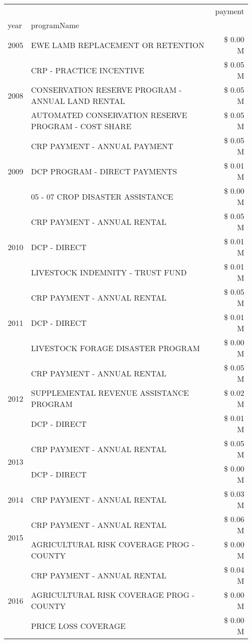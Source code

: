 \begin{tabular}{llr}
\toprule
 &  & payment \\
year & programName &  \\
\midrule
2005 & EWE LAMB REPLACEMENT OR RETENTION & \$ 0.00 M \\
\cline{1-3}
\multirow[t]{3}{*}{2008} & CRP - PRACTICE INCENTIVE & \$ 0.05 M \\
 & CONSERVATION RESERVE PROGRAM - ANNUAL LAND RENTAL & \$ 0.05 M \\
 & AUTOMATED CONSERVATION RESERVE PROGRAM - COST SHARE & \$ 0.05 M \\
\cline{1-3}
\multirow[t]{3}{*}{2009} & CRP PAYMENT - ANNUAL PAYMENT & \$ 0.05 M \\
 & DCP PROGRAM - DIRECT PAYMENTS & \$ 0.01 M \\
 & 05 - 07 CROP DISASTER ASSISTANCE & \$ 0.00 M \\
\cline{1-3}
\multirow[t]{3}{*}{2010} & CRP PAYMENT - ANNUAL RENTAL & \$ 0.05 M \\
 & DCP - DIRECT & \$ 0.01 M \\
 & LIVESTOCK INDEMNITY - TRUST FUND & \$ 0.01 M \\
\cline{1-3}
\multirow[t]{3}{*}{2011} & CRP PAYMENT - ANNUAL RENTAL & \$ 0.05 M \\
 & DCP - DIRECT & \$ 0.01 M \\
 & LIVESTOCK FORAGE DISASTER PROGRAM & \$ 0.00 M \\
\cline{1-3}
\multirow[t]{3}{*}{2012} & CRP PAYMENT - ANNUAL RENTAL & \$ 0.05 M \\
 & SUPPLEMENTAL REVENUE ASSISTANCE PROGRAM & \$ 0.02 M \\
 & DCP - DIRECT & \$ 0.01 M \\
\cline{1-3}
\multirow[t]{2}{*}{2013} & CRP PAYMENT - ANNUAL RENTAL & \$ 0.05 M \\
 & DCP - DIRECT & \$ 0.00 M \\
\cline{1-3}
2014 & CRP PAYMENT - ANNUAL RENTAL & \$ 0.03 M \\
\cline{1-3}
\multirow[t]{2}{*}{2015} & CRP PAYMENT - ANNUAL RENTAL & \$ 0.06 M \\
 & AGRICULTURAL RISK COVERAGE PROG - COUNTY & \$ 0.00 M \\
\cline{1-3}
\multirow[t]{3}{*}{2016} & CRP PAYMENT - ANNUAL RENTAL & \$ 0.04 M \\
 & AGRICULTURAL RISK COVERAGE PROG - COUNTY & \$ 0.00 M \\
 & PRICE LOSS COVERAGE & \$ 0.00 M \\

\end{tabular}
